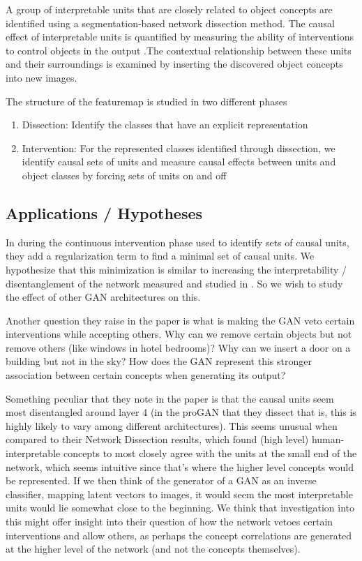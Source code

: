 \documentclass{article}
\begin{document}
 A group of interpretable units that are closely related to object concepts are identified using a segmentation-based network dissection method. The causal effect of interpretable units is quantified by measuring the ability of interventions to control objects in the output .The contextual relationship between these units and their surroundings is examined by inserting the discovered object concepts into new images.

The structure of the featuremap is studied in two different phases
\begin{enumerate} 
\item Dissection: Identify the classes that have an explicit representation
\item Intervention: For the represented classes identified through dissection, we identify causal sets of units and measure causal effects between units and object classes by forcing sets of units on and off 
\end{enumerate}

\subsection{Applications / Hypotheses}

In \citet{gandissect2019} during the continuous intervention phase used to identify sets of causal units, they add a regularization term to find a minimal set of causal units. We hypothesize that this minimization is similar to increasing the interpretability / disentanglement of the network measured and studied in \cite{netdissect2017}. So we wish to study the effect of other GAN architectures on this. 

Another question they raise in the paper is what is making the GAN veto certain interventions while accepting others. Why can we remove certain objects but not remove others (like windows in hotel bedrooms)? Why can we insert a door on a building but not in the sky? How does the GAN represent this stronger association between certain concepts when generating its output? 

Something peculiar that they note in the paper is that the causal units seem most disentangled around layer 4 (in the proGAN that they dissect that is, this is highly likely to vary among different architectures). This seems unusual when compared to their Network Dissection results, which found (high level) human-interpretable concepts to most closely agree with the units at the small end of the network, which seems intuitive since that's where the higher level concepts would be represented. If we then think of the generator of a GAN as an inverse classifier, mapping latent vectors to images, it would seem the most interpretable units would lie somewhat close to the beginning. We think that investigation into this might offer insight into their question of how the network vetoes certain interventions and allow others, as perhaps the concept correlations are generated at the higher level of the network (and not the concepts themselves). 
\end{document}
